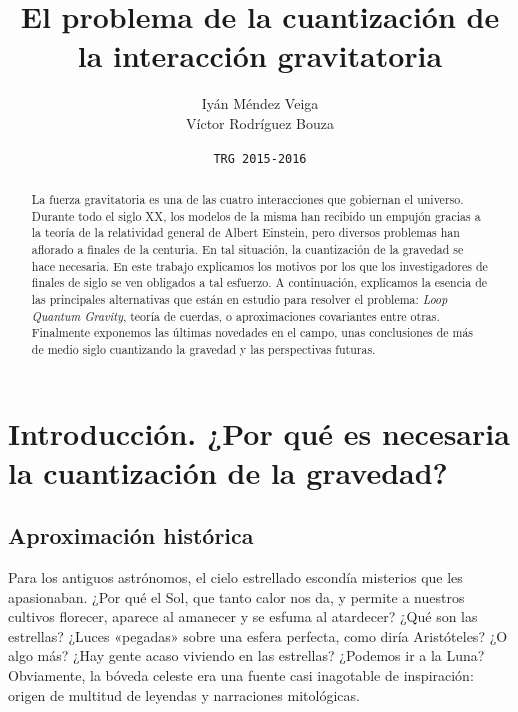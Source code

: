 \documentclass[11pt,a4paper,titlepage]{article}
\title{\Huge\textbf{El problema de la cuantización de la interacción gravitatoria}}
\author{\textsf{Iyán Méndez Veiga}\\ \textsf{Víctor Rodríguez Bouza}}
\date{\texttt{TRG 2015-2016}}
\begin{document}
%
%
%
%
\begin{titlepage}

\end{titlepage}
%
%
%
%
%
%
%
%
\newpage
\tableofcontents
\newpage
%
%
%
%
%
%
%
%
\begin{abstract}
La fuerza gravitatoria es una de las cuatro interacciones que gobiernan el universo. Durante todo el siglo XX, los modelos de la misma han recibido un empujón gracias a la teoría de la relatividad general de Albert Einstein, pero diversos problemas han aflorado a finales de la centuria. En tal situación, la cuantización de la gravedad se hace necesaria. En este trabajo explicamos los motivos por los que los investigadores de finales de siglo se ven obligados a tal esfuerzo. A continuación, explicamos la esencia de las principales alternativas que están en estudio para resolver el problema: \textit{Loop Quantum Gravity}, teoría de cuerdas, o aproximaciones covariantes entre otras. Finalmente exponemos las últimas novedades en el campo, unas conclusiones de más de medio siglo cuantizando la gravedad y las perspectivas futuras.
\end{abstract}
%
%
%
%
\section{Introducción. ¿Por qué es necesaria la cuantización de la gravedad?} %

\subsection{Aproximación histórica}

Para los antiguos astrónomos, el cielo estrellado escondía misterios que les apasionaban. ¿Por qué el Sol, que tanto calor nos da, y permite a nuestros cultivos florecer, aparece al amanecer y se esfuma al atardecer? ¿Qué son las estrellas? ¿Luces «pegadas» sobre una esfera perfecta, como diría Aristóteles? ¿O algo más? ¿Hay gente acaso viviendo en las estrellas? ¿Podemos ir a la Luna? Obviamente, la bóveda celeste era una fuente casi inagotable de inspiración: origen de multitud de leyendas y narraciones mitológicas.
\end{document}

